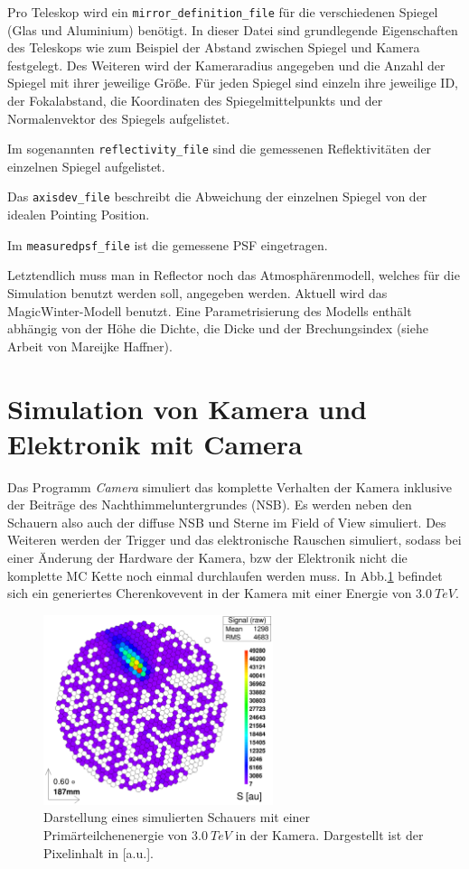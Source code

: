 Pro Teleskop wird ein \texttt{mirror\_definition\_file} für die verschiedenen Spiegel (Glas und Aluminium) benötigt.
In dieser Datei sind grundlegende Eigenschaften des Teleskops wie zum Beispiel der Abstand zwischen Spiegel und Kamera festgelegt. 
Des Weiteren wird der Kameraradius angegeben und die Anzahl der Spiegel mit ihrer jeweilige Größe.
Für jeden Spiegel sind einzeln ihre jeweilige ID, der Fokalabstand, die Koordinaten des Spiegelmittelpunkts und der Normalenvektor des Spiegels aufgelistet.

Im sogenannten \texttt{reflectivity\_file} sind die gemessenen Reflektivitäten der einzelnen Spiegel aufgelistet.

Das \texttt{axisdev\_file} beschreibt die Abweichung der einzelnen Spiegel von der idealen Pointing Position.

Im \texttt{measuredpsf\_file} ist die gemessene PSF eingetragen.

Letztendlich muss man in Reflector noch das Atmosphärenmodell, welches für die Simulation benutzt werden soll, angegeben werden. 
Aktuell wird das MagicWinter-Modell benutzt. 
Eine Parametrisierung des Modells enthält abhängig von der Höhe die Dichte, die Dicke und der Brechungsindex (siehe Arbeit von Mareijke Haffner).


\section{Simulation von Kamera und Elektronik mit Camera}
\label{sec:Camera}
Das Programm \textit{Camera} simuliert das komplette Verhalten der Kamera inklusive der Beiträge des Nachthimmeluntergrundes (NSB).
Es werden neben den Schauern also auch der diffuse NSB und Sterne im Field of View simuliert. 
Des Weiteren werden der Trigger und das elektronische Rauschen simuliert, sodass bei einer Änderung der Hardware der Kamera, bzw der Elektronik nicht die komplette MC Kette noch einmal durchlaufen werden muss.
In Abb.\ref{Kamera-Bild} befindet sich ein generiertes Cherenkovevent in der Kamera mit einer Energie von $\SI{3.0}{TeV}$.

\begin{figure}
    \centering
    \includegraphics[width=0.6\textwidth]{./Plots/03_MonteCarlos/Signal_Job481_RunNr1513276_511_e3.0TeV_Zd32.2_fertig.png}
    \caption{Darstellung eines simulierten Schauers mit einer Primärteilchenenergie von $\SI{3.0}{TeV}$ in der Kamera. Dargestellt ist der Pixelinhalt in [a.u.].}
    \label{Kamera-Bild}
\end{figure}

